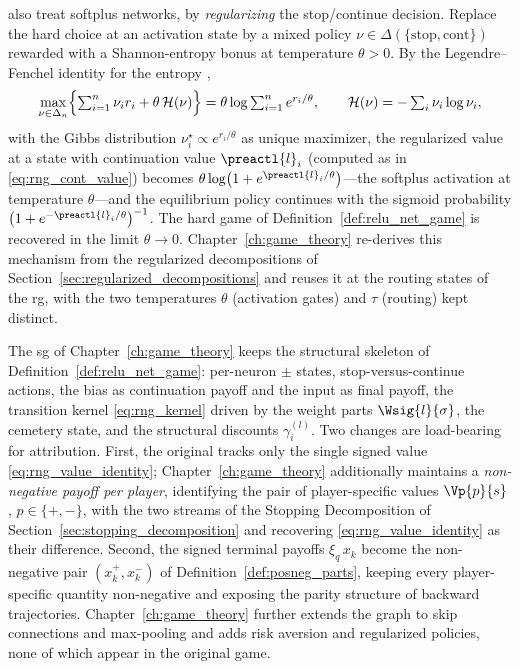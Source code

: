 \begin{remark}\label{rem:softplus_game}
\textcite{Gaubert2025} also treat softplus networks, by \emph{regularizing} the stop/continue decision. Replace the hard choice at an activation state by a mixed policy $\nu \in \Delta(\{\mathrm{stop}, \mathrm{cont}\})$ rewarded with a Shannon-entropy bonus at temperature $\theta > 0$. By the Legendre--Fenchel identity for the entropy \cite{BoydVandenberghe2004},
\begin{equation}
	\max_{\nu \in \Delta_n} \Bigl\{ \textstyle\sum_{i=1}^{n} \nu_i r_i + \theta\, \mathcal{H}(\nu) \Bigr\}
	= \theta \log \textstyle\sum_{i=1}^{n} e^{r_i / \theta},
	\qquad
	\mathcal{H}(\nu) = -\textstyle\sum_i \nu_i \log \nu_i,
	\label{eq:legendre_fenchel}
\end{equation}
with the Gibbs distribution $\nu^{\star}_i \propto e^{r_i/\theta}$ as unique maximizer, the regularized value at a state with continuation value $\preactl{l}_i$ (computed as in \eqref{eq:rng_cont_value}) becomes $\theta \log\bigl(1 + e^{\preactl{l}_i / \theta}\bigr)$---the softplus activation at temperature $\theta$---and the equilibrium policy continues with the sigmoid probability $\bigl(1 + e^{-\preactl{l}_i/\theta}\bigr)^{-1}$. The hard game of Definition~\ref{def:relu_net_game} is recovered in the limit $\theta \to 0$. Chapter~\ref{ch:game_theory} re-derives this mechanism from the regularized decompositions of Section~\ref{sec:regularized_decompositions} and reuses it at the routing states of the \ac{rg}, with the two temperatures $\theta$ (activation gates) and $\tau$ (routing) kept distinct.
\end{remark}

\begin{remark}\label{rem:inherited_vs_new}
The \ac{sg} of Chapter~\ref{ch:game_theory} keeps the structural skeleton of Definition~\ref{def:relu_net_game}: per-neuron $\pm$ states, stop-versus-continue actions, the bias as continuation payoff and the input as final payoff, the transition kernel \eqref{eq:rng_kernel} driven by the weight parts $\Wsig{l}{\sigma}$, the cemetery state, and the structural discounts $\gamma^{(l)}_i$. Two changes are load-bearing for attribution. First, the original tracks only the single signed value \eqref{eq:rng_value_identity}; Chapter~\ref{ch:game_theory} additionally maintains a \emph{non-negative payoff per player}, identifying the pair of player-specific values $\Vp{p}{s}$, $p \in \{+,-\}$, with the two streams of the Stopping Decomposition of Section~\ref{sec:stopping_decomposition} and recovering \eqref{eq:rng_value_identity} as their difference. Second, the signed terminal payoffs $\xi_q\, x_k$ become the non-negative pair $(x_k^{+}, x_k^{-})$ of Definition~\ref{def:posneg_parts}, keeping every player-specific quantity non-negative and exposing the parity structure of backward trajectories. Chapter~\ref{ch:game_theory} further extends the graph to skip connections and max-pooling and adds risk aversion and regularized policies, none of which appear in the original game.
\end{remark}


